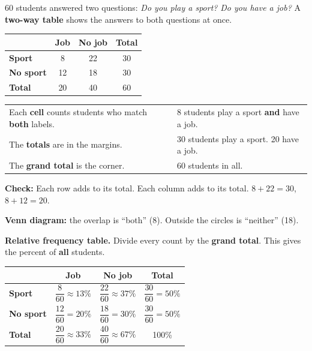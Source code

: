 \documentclass[11pt]{article}
\begin{document}

60 students answered two questions: \textit{Do you play a sport?} \textit{Do you have a job?}
A \textbf{two-way table} shows the answers to both questions at once.

\vspace{0.6em}
\begin{minipage}[c]{0.5\linewidth}
\renewcommand{\arraystretch}{1.4}
\begin{tabular}{|l|c|c|c|}\hline
 & \textbf{Job} & \textbf{No job} & \textbf{Total} \\ \hline
\textbf{Sport} & 8 & 22 & 30 \\ \hline
\textbf{No sport} & 12 & 18 & 30 \\ \hline
\textbf{Total} & 20 & 40 & 60 \\ \hline
\end{tabular}
\end{minipage}\hfill
\begin{minipage}[c]{0.45\linewidth}\centering
{}
\end{minipage}

\vspace{0.6em}
\begin{tabular}{@{}ll}
Each \textbf{cell} counts students who match \textbf{both} labels. & 8 students play a sport \textbf{and} have a job.\\
The \textbf{totals} are in the margins. & 30 students play a sport. 20 have a job.\\
The \textbf{grand total} is the corner. & 60 students in all.\\
\end{tabular}

\vspace{0.4em}
\textbf{Check:} Each row adds to its total. Each column adds to its total. \quad $8 + 22 = 30$, \; $8 + 12 = 20$.

\vspace{0.4em}
\textbf{Venn diagram:} the overlap is ``both'' (8). Outside the circles is ``neither'' (18).

\vspace{1em}
\textbf{Relative frequency table.} Divide every count by the \textbf{grand total}. This gives the percent of \textbf{all} students.

\vspace{0.4em}
\renewcommand{\arraystretch}{2.3}
\begin{tabular}{|l|c|c|c|}\hline
 & \textbf{Job} & \textbf{No job} & \textbf{Total} \\ \hline
\textbf{Sport} & $\dfrac{8}{60} \approx 13\%$ & $\dfrac{22}{60} \approx 37\%$ & $\dfrac{30}{60} = 50\%$ \\ \hline
\textbf{No sport} & $\dfrac{12}{60} = 20\%$ & $\dfrac{18}{60} = 30\%$ & $\dfrac{30}{60} = 50\%$ \\ \hline
\textbf{Total} & $\dfrac{20}{60} \approx 33\%$ & $\dfrac{40}{60} \approx 67\%$ & 100\% \\ \hline
\end{tabular}
\end{document}
